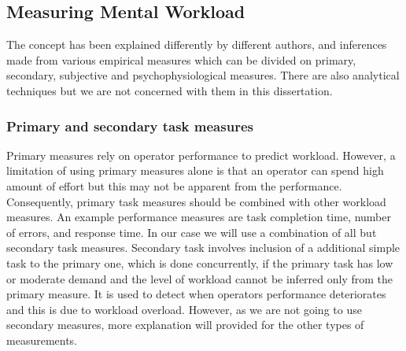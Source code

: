 \documentclass[a4paper]{report}
\begin{document}
			\subsection{Measuring Mental Workload}
			The concept has been explained differently by different authors, and inferences made from various empirical measures which can be divided on primary, secondary, subjective and psychophysiological measures. There are also analytical techniques but we are not concerned with them in this dissertation.
				\subsubsection{Primary and secondary task measures}
				Primary measures rely on operator performance to predict workload. However, a limitation of using primary measures alone is that an operator can spend high amount of effort but this may not be apparent from the performance\cite{wilson2015evaluation}. Consequently, primary task measures should be combined with other workload measures. An example performance measures are task completion time, number of errors, and response time. In our case we will use a combination of all but secondary task measures. Secondary task involves inclusion of a additional simple task to the primary one, which is done concurrently, if the primary task has low or moderate demand and the level of workload cannot be inferred only from the primary measure. It is used to detect when operators performance deteriorates and this is due to workload overload. However, as we are not going to use secondary measures, more explanation will provided for the other types of measurements.
\end{document}
